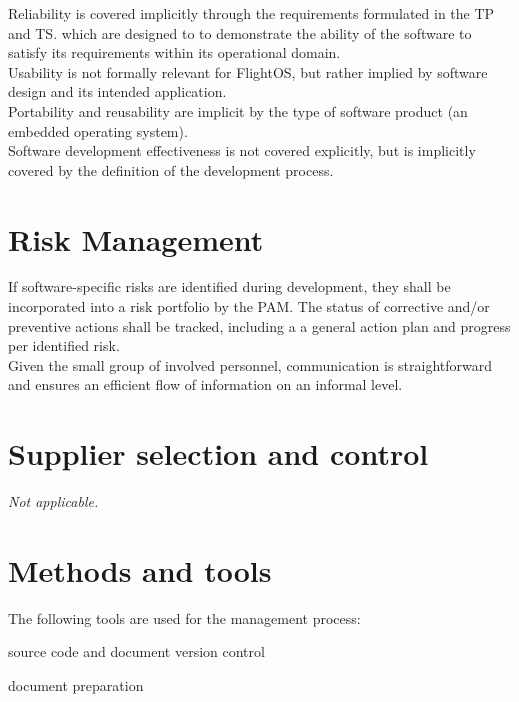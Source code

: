 \noindent
Reliability is covered implicitly through the requirements formulated in the
\gls{TP}\cite{flightosTP} and \gls{TS}\cite{flightosTS}. which are designed to
to demonstrate the ability of the software to satisfy its requirements within
its operational domain.\\

\noindent
Usability is not formally relevant for FlightOS, but rather implied by software
design and its intended application.\\

\noindent
Portability and reusability are implicit by the type of software product
(an embedded operating system).\\

\noindent
Software development effectiveness is not covered explicitly, but is implicitly
covered by the definition of the development process.


\section{Risk Management}

If software-specific risks are identified during development, they shall be
incorporated into a risk portfolio by the \gls{PAM}. The status of corrective
and/or preventive actions shall be tracked, including a a general action plan
and progress per identified risk.\\

\noindent
Given the small group of involved personnel, communication is straightforward
and ensures an efficient flow of information on an informal level.


\section{Supplier selection and control}

\emph{Not applicable.}


\section{Methods and tools}

The following tools are used for the management process:

\begin{description}[labelwidth=4em,leftmargin=\parindent,labelindent=\parindent]
	\item[\textbf{git}]		source code and document version control
	\item[\textbf{TeX Live}]	document preparation
\end{description}


